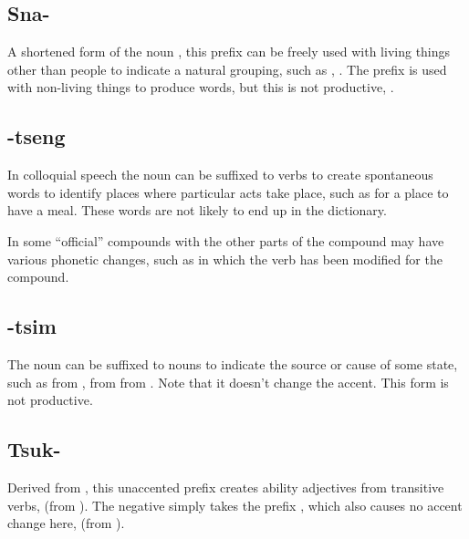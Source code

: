 \subsection{Sna-} A shortened form of the noun  , this prefix can be freely used with living
things other than people to indicate a natural grouping, such as
 ,  .  The prefix is used with non-living things to produce words,
but this is not productive,  .

\subsection{-tseng} In colloquial speech the noun  
can be suffixed to verbs to create spon\-ta\-ne\-ous words to identify
places where particular acts take place, such as  for a
place to have a meal.  These words are not likely to end up in the
dictionary.

In some ``official'' compounds with  the other parts of the
compound may have various phonetic changes, such
as   in which the verb  has been
modified for the compound.

\subsection{-tsim} The noun   can be suffixed to
nouns to indicate the source or cause of some state, such
as  
from  ,   from  
 
from  .  Note that
it doesn't change the accent.  This form is not productive.

\subsection{Tsuk-} Derived from , this unaccented prefix
creates ability adjectives from trans\-it\-ive verbs, 
 (from  ).  The negative simply takes the
prefix , which also causes no accent change here,
  (from  ).

